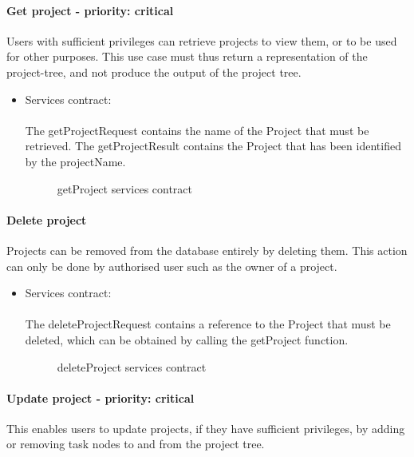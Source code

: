 \paragraph{Get project - priority: critical}
Users with sufficient privileges can retrieve projects to view them, or to be used for other purposes. This use case must thus return a representation of the project-tree, and not produce the output of the project tree.

\begin{itemize}
	\item Services contract:\\ \\
	The getProjectRequest contains the name of the Project that must be retrieved. The getProjectResult contains the Project that has been identified by the projectName.
	\begin{figure}[H]
    	\centering
    	\caption{getProject services contract}
    	\label{fig:getProject_services_contract}
   	\end{figure}
\end{itemize}

\paragraph{Delete project}
Projects can be removed from the database entirely by deleting them. This action can only be done by authorised user such as the owner of a project.

\begin{itemize}
	\item Services contract:\\ \\
	The deleteProjectRequest contains a reference to the Project that must be deleted, which can be obtained by calling the getProject function.
	\begin{figure}[H]
    	\centering
    	\caption{deleteProject services contract}
    	\label{fig:deleteProject_services_contract}
   	\end{figure}
\end{itemize}


\paragraph{Update project - priority: critical}
This enables users to update projects, if they have sufficient privileges, by adding or removing task nodes to and from the project tree.

